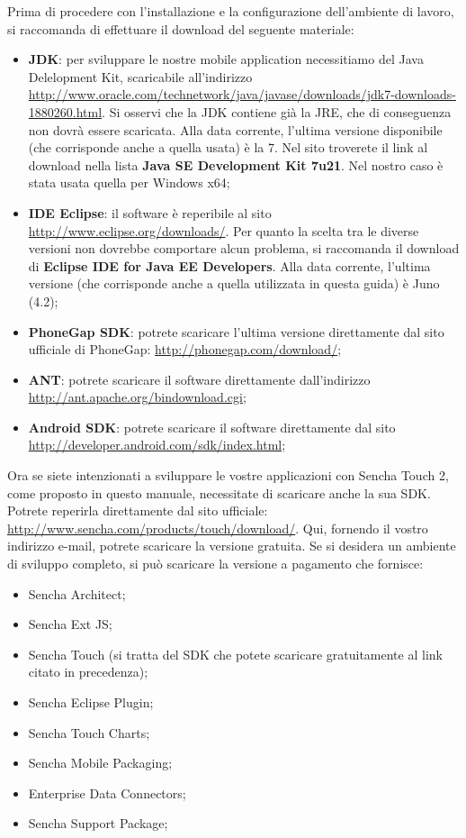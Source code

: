 \documentclass[10pt,a4paper,onecolumn]{article}
\begin{document}
Prima di procedere con l'installazione e la configurazione dell'ambiente di lavoro, si raccomanda di effettuare il download del seguente materiale:

\begin{itemize}
	\item \textbf{JDK}: per sviluppare le nostre mobile application necessitiamo del Java Delelopment Kit, scaricabile all'indirizzo \url{http://www.oracle.com/technetwork/java/javase/downloads/jdk7-downloads-1880260.html}. Si osservi che la JDK contiene già la JRE, che di conseguenza non dovrà essere scaricata. Alla data corrente, l'ultima versione disponibile (che corrisponde anche a quella usata) è la 7. Nel sito troverete il link al download nella lista \textbf{Java SE Development Kit 7u21}. Nel nostro caso è stata usata quella per  Windows x64;
	\item \textbf{IDE Eclipse}: il software è reperibile al sito \url{http://www.eclipse.org/downloads/}. Per quanto la scelta tra le diverse versioni non dovrebbe comportare alcun problema, si raccomanda il download di \textbf{Eclipse IDE for Java EE Developers}. Alla data corrente, l'ultima versione (che corrisponde anche a quella utilizzata in questa guida) è Juno (4.2);
	\item \textbf{PhoneGap SDK}: potrete scaricare l'ultima versione  direttamente dal sito ufficiale di PhoneGap: \url{http://phonegap.com/download/};
	\item \textbf{ANT}: potrete scaricare il software direttamente dall'indirizzo \url{http://ant.apache.org/bindownload.cgi};
	\item \textbf{Android SDK}: potrete scaricare il software direttamente dal sito \url{http://developer.android.com/sdk/index.html};
\end{itemize}

Ora se siete intenzionati a sviluppare le vostre applicazioni con Sencha Touch 2, come proposto in questo manuale, necessitate di scaricare anche la sua SDK. Potrete reperirla direttamente dal sito ufficiale: \url{http://www.sencha.com/products/touch/download/}. Qui, fornendo il vostro indirizzo e-mail, potrete scaricare la versione gratuita. Se si desidera un ambiente di sviluppo completo, si può scaricare la versione a pagamento che fornisce:
\begin{itemize}
	\item Sencha Architect;
	\item Sencha Ext JS;
	\item Sencha Touch (si tratta del SDK che potete scaricare gratuitamente al link citato in precedenza);
	\item Sencha Eclipse Plugin;
	\item Sencha Touch Charts;
	\item Sencha Mobile Packaging;
	\item Enterprise Data Connectors;
	\item Sencha Support Package;
\end{itemize}
\end{document}
